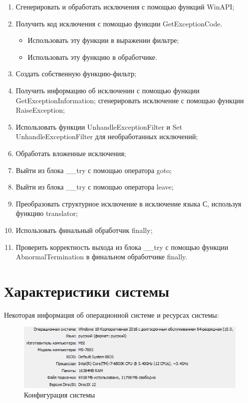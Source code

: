 \documentclass[14pt,a4paper,report]{report}
\begin{document}
\begin{enumerate}
	\item Сгенерировать и обработать исключения с помощью функций WinAPI;
	\item Получить код исключения с помощью функции GetExceptionCode.
	\begin{itemize}
		\item Использовать эту функции в выражении фильтре;
		\item Использовать эту функцию в обработчике.
	\end{itemize}
	\item Создать собственную функцию-фильтр;
	\item Получить информацию об исключении с помощью функции GetExceptionInformation; сгенерировать исключение с помощью функции RaiseException;
	\item Использовать функции UnhandleExceptionFilter и Set UnhandleExceptionFilter для необработанных исключений;
	\item Обработать вложенные исключения;
	\item Выйти из блока \_\_try с помощью оператора goto;
	\item Выйти из блока \_\_try с помощью оператора leave;
	\item Преобразовать структурное исключение в исключение языка С, используя функцию translator;
	\item Использовать финальный обработчик finally;
	\item Проверить корректность выхода из блока \_\_try с помощью функции AbnormalTermination в финальном обработчике finally.
\end{enumerate}

\clearpage

\section{Характеристики системы}

Некоторая информация об операционной системе и ресурсах системы:

\begin{figure}[h!]
	\centering
	\includegraphics[scale = 1.05]{images/0_s.png}
	\caption{Конфигурация системы}
\end{figure}
\end{document}
